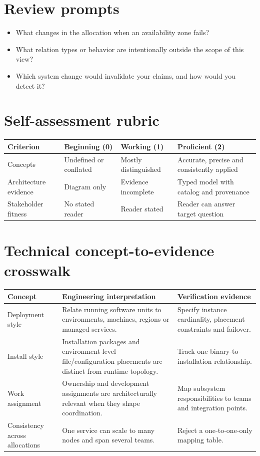 \documentclass[10pt,letterpaper]{article}
\begin{document}
\section{Review prompts}
\begin{itemize}
\item What changes in the allocation when an availability zone fails?
\item What relation types or behavior are intentionally outside the scope of this view?
\item Which system change would invalidate your claims, and how would you detect it?
\end{itemize}
\section{Self-assessment rubric}
\small
\begin{tabularx}{\linewidth}{@{}YYYY@{}}
\toprule
\textbf{Criterion} & \textbf{Beginning (0)} & \textbf{Working (1)} & \textbf{Proficient (2)} \\
\midrule
Concepts & Undefined or conflated & Mostly distinguished & Accurate, precise and consistently applied \\
Architecture evidence & Diagram only & Evidence incomplete & Typed model with catalog and provenance \\
Stakeholder fitness & No stated reader & Reader stated & Reader can answer target question \\
\bottomrule
\end{tabularx}
\normalsize
\section{Technical concept-to-evidence crosswalk}
\small
\begin{tabularx}{\linewidth}{@{}YYY@{}}
\toprule
\textbf{Concept} & \textbf{Engineering interpretation} & \textbf{Verification evidence} \\
\midrule
Deployment style & Relate running software units to environments, machines, regions or managed services. & Specify instance cardinality, placement constraints and failover. \\
Install style & Installation packages and environment-level file/configuration placements are distinct from runtime topology. & Track one binary-to-installation relationship. \\
Work assignment & Ownership and development assignments are architecturally relevant when they shape coordination. & Map subsystem responsibilities to teams and integration points. \\
Consistency across allocations & One service can scale to many nodes and span several teams. & Reject a one-to-one-only mapping table. \\
\bottomrule
\end{tabularx}
\normalsize
\end{document}
